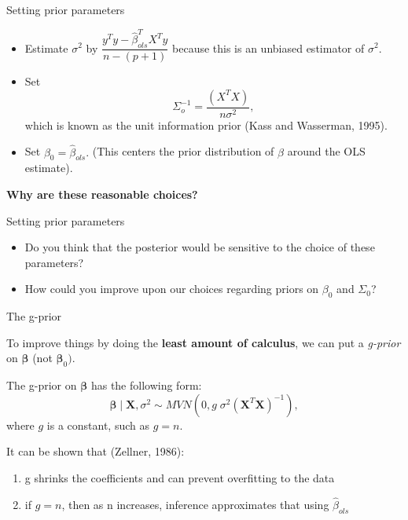 \documentclass[
  ignorenonframetext,
]{beamer}
\providecommand{\tightlist}{%
  \setlength{\itemsep}{0pt}\setlength{\parskip}{0pt}}
\newcommand{\bbeta}{\bm{\beta}}
\newcommand{\bX}   {\bm{X}}
\begin{document}
\begin{frame}{Setting prior parameters}
\protect\hypertarget{setting-prior-parameters-1}{}

\begin{itemize}
\item
  Estimate \(\sigma^2\) by
  \(\dfrac{y^Ty - \hat{\beta}_{ols}^TX^Ty}{n - (p + 1)}\) because this
  is an unbiased estimator of \(\sigma^2.\)
\item
  Set \[\Sigma_{o}^{-1} = \frac{(X^TX)}{n\sigma^2},\] which is known as
  the unit information prior (Kass and Wasserman, 1995).
\item
  Set \(\beta_0 = \hat{\beta}_{ols}.\) (This centers the prior
  distribution of \(\beta\) around the OLS estimate).
\end{itemize}

\textbf{Why are these reasonable choices?}

\end{frame}

\begin{frame}{Setting prior parameters}
\protect\hypertarget{setting-prior-parameters-2}{}

\begin{itemize}
\item
  Do you think that the posterior would be sensitive to the choice of
  these parameters?
\item
  How could you improve upon our choices regarding priors on \(\beta_0\)
  and \(\Sigma_0\)?
\end{itemize}

\end{frame}

\begin{frame}{The g-prior}
\protect\hypertarget{the-g-prior}{}

To improve things by doing the \textbf{least amount of calculus}, we can
put a \emph{g-prior} on \(\bbeta\) (not \(\bbeta_0).\)

The g-prior on \(\bbeta\) has the following form:
\[ \bbeta \mid \bX, \sigma^2  \sim MVN(0, g\; \sigma^2 (\bX^T\bX)^{-1}),\]
where \(g\) is a constant, such as \(g=n.\)

It can be shown that (Zellner, 1986):

\begin{enumerate}
\tightlist
\item
  g shrinks the coefficients and can prevent overfitting to the data
\item
  if \(g = n\), then as n increases, inference approximates that using
  \(\hat{\beta}_{ols}\)
\end{enumerate}

\end{frame}
\end{document}
